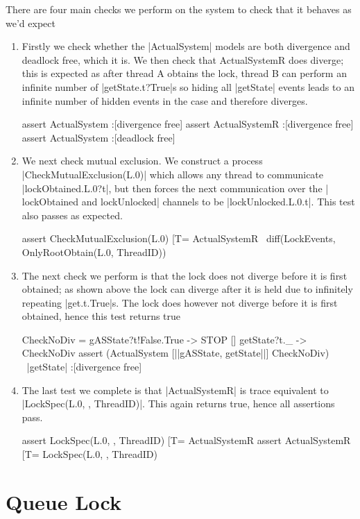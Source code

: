 There are four main checks we perform on the system to check that it behaves as we'd expect
\begin{enumerate}
  \item Firstly we check whether the |ActualSystem| models are both divergence and deadlock free, which it is. We then check that ActualSystemR does diverge; this is expected as after thread A obtains the lock, thread B can perform an infinite number of |getState.t?True|s so hiding all |getState| events leads to an infinite number of hidden events in the case and therefore diverges.
\begin{cspm}
  assert ActualSystem :[divergence free]
  assert ActualSystemR :[divergence free]
  assert ActualSystem :[deadlock free]
\end{cspm}
\item We next check mutual exclusion. We construct a process |CheckMutualExclusion(L.0)| which allows any thread to communicate |lockObtained.L.0?t|, but then forces the next communication over the | lockObtained and lockUnlocked| channels to be |lockUnlocked.L.0.t|. This test also passes as expected.
\begin{cspm}
  assert CheckMutualExclusion(L.0) [T= ActualSystemR \ diff(LockEvents, OnlyRootObtain(L.0, ThreadID))
\end{cspm}
\item The next check we perform is that the lock does not diverge before it is first obtained; as shown above the lock can diverge after it is held due to infinitely repeating |get.t.True|s. The lock does however not diverge before it is first obtained, hence this test returns true
\begin{cspm}
  CheckNoDiv = gASState?t!False.True -> STOP
             [] getState?t._ -> CheckNoDiv
assert (ActualSystem [|{|gASState, getState|}|] CheckNoDiv) \ {|getState|} :[divergence free]
\end{cspm}
\item The last test we complete is that |ActualSystemR| is trace equivalent to |LockSpec(L.0, {}, ThreadID)|. This again returns true, hence all assertions pass.
\begin{cspm}
  assert LockSpec(L.0, {}, ThreadID) [T= ActualSystemR
  assert ActualSystemR [T= LockSpec(L.0, {}, ThreadID)
\end{cspm}
\end{enumerate}
\section{Queue Lock}


